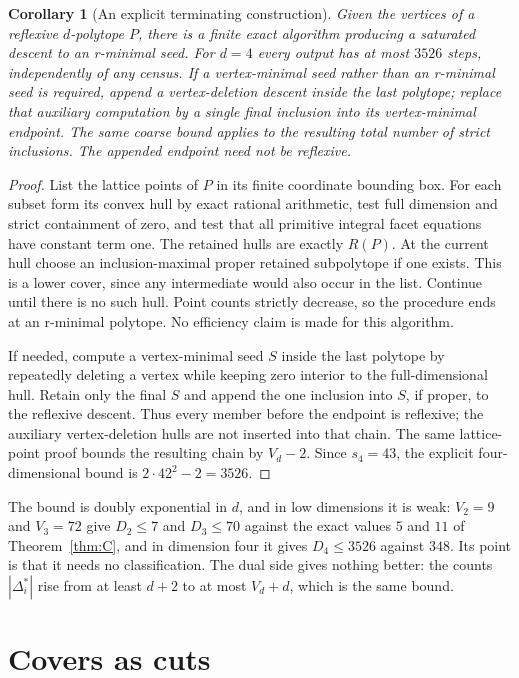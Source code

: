 \documentclass[manuscript]{aomart}
\newtheorem{corollary}[theorem]{Corollary}
\theoremstyle{definition}
\theoremstyle{remark}
\newcommand{\UB}{348}
\begin{document}
\begin{corollary}[An explicit terminating construction]\label{cor:algorithm}
Given the vertices of a reflexive $d$-polytope $P$, there is a finite
exact algorithm producing a saturated descent to an r-minimal seed.
For $d=4$ every output has at most $3526$ steps, independently of any
census. If a vertex-minimal seed rather than an r-minimal seed is
required, append a vertex-deletion descent inside the last polytope;
replace that auxiliary computation by a single final inclusion into
its vertex-minimal endpoint. The same coarse bound applies to the
resulting total number of strict inclusions.
The appended endpoint need not be reflexive.
\end{corollary}
\begin{proof}
List the lattice points of $P$ in its finite coordinate bounding box.
For each subset form its convex hull by exact rational arithmetic,
test full dimension and strict containment of zero, and test that all
primitive integral facet equations have constant term one. The retained
hulls are exactly $R(P)$. At the current hull choose an inclusion-maximal
proper retained subpolytope if one exists. This is a lower cover, since
any intermediate would also occur in the list. Continue until there is
no such hull. Point counts strictly decrease, so the procedure ends at
an r-minimal polytope. No efficiency claim is made for this algorithm.

If needed, compute a vertex-minimal seed $S$ inside the last polytope
by repeatedly deleting a vertex while keeping zero interior to the
full-dimensional hull. Retain only the final $S$ and append the one
inclusion into $S$, if proper, to the reflexive descent. Thus every
member before the endpoint is reflexive; the auxiliary vertex-deletion
hulls are not inserted into that chain. The same lattice-point proof
bounds the resulting chain by $V_d-2$. Since $s_4=43$, the explicit
four-dimensional bound is $2\cdot42^2-2=3526$.
\end{proof}

The bound is doubly exponential in $d$, and in low dimensions it is weak:
$V_2=9$ and $V_3=72$ give $D_2\le7$ and $D_3\le70$ against the exact values
$5$ and $11$ of Theorem~\ref{thm:C}, and in dimension four it gives
$D_4\le3526$ against $\UB$. Its point is that it needs no classification.
The dual side gives nothing better: the counts $|\Delta_i^*|$ rise from at
least $d+2$ to at most $V_d+d$, which is the same bound.

\section{Covers as cuts}\label{sec:cuts}
\end{document}
